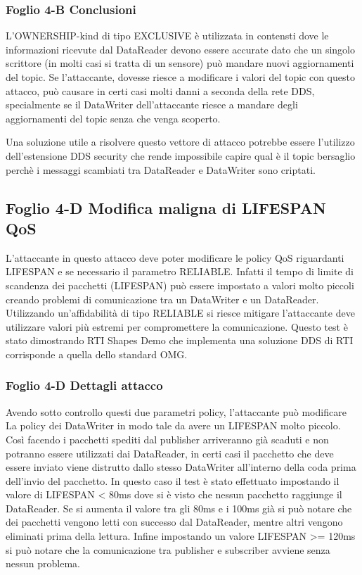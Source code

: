 \subsubsection{Foglio 4-B Conclusioni}
L'OWNERSHIP-kind di tipo EXCLUSIVE è utilizzata in contensti dove le
informazioni ricevute dal DataReader devono essere accurate dato che un singolo
scrittore (in molti casi si tratta di un sensore) può mandare nuovi aggiornamenti
del topic. Se l'attaccante, dovesse riesce a modificare i valori del topic con
questo attacco, può causare in certi casi molti danni a seconda della rete DDS, 
specialmente se il DataWriter dell'attaccante riesce a mandare degli aggiornamenti
del topic senza che venga scoperto.

Una soluzione utile a risolvere questo vettore di attacco potrebbe essere l'utilizzo
dell'estensione DDS security che rende impossibile capire qual è il topic bersaglio
perchè i messaggi scambiati tra DataReader e DataWriter sono criptati.

\subsection{Foglio 4-D Modifica maligna di LIFESPAN QoS}
L'attaccante in questo attacco deve poter modificare le policy QoS riguardanti
LIFESPAN e se necessario il parametro RELIABLE.
Infatti il tempo di limite di scandenza dei pacchetti (LIFESPAN)
può essere impostato a valori molto piccoli creando problemi di comunicazione
tra un DataWriter e un DataReader. Utilizzando un'affidabilità di tipo RELIABLE
si riesce mitigare l'attaccante deve utilizzare valori più estremi per compromettere
la comunicazione. Questo test è stato dimostrando RTI Shapes Demo che implementa una
soluzione DDS di RTI corrisponde a quella dello standard OMG.

\subsubsection{Foglio 4-D Dettagli attacco}
Avendo sotto controllo questi due parametri policy, l'attaccante può modificare La
policy dei DataWriter in modo tale da avere un LIFESPAN molto piccolo. Così 
facendo i pacchetti spediti dal publisher arriveranno già scaduti e non potranno
essere utilizzati dai DataReader, in certi casi il pacchetto che deve essere inviato
viene distrutto dallo stesso DataWriter all'interno della coda prima dell'invio 
del pacchetto. In questo caso il test è stato effettuato impostando il valore di
LIFESPAN < 80ms dove si è visto che nessun pacchetto raggiunge il DataReader.
Se si aumenta il valore tra gli 80ms e i 100ms già si può notare che dei pacchetti
vengono letti con successo dal DataReader, mentre altri vengono eliminati prima
della lettura. Infine impostando un valore LIFESPAN >= 120ms si può notare che 
la comunicazione tra publisher e subscriber avviene senza nessun problema.

